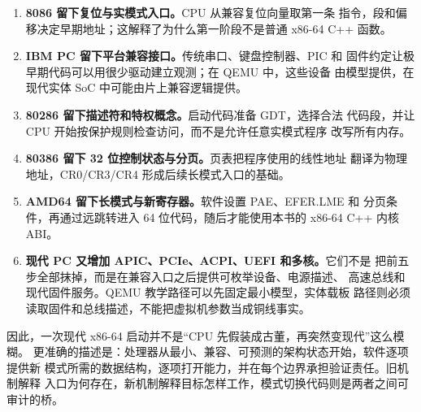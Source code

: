 \begin{enumerate}[leftmargin=2.4em]
  \item \textbf{8086 留下复位与实模式入口。}CPU 从兼容复位向量取第一条
        指令，段和偏移决定早期地址；这解释了为什么第一阶段不是普通
        x86-64 C++ 函数。
  \item \textbf{IBM PC 留下平台兼容接口。}传统串口、键盘控制器、PIC 和
        固件约定让极早期代码可以用很少驱动建立观测；在 QEMU 中，这些设备
        由模型提供，在现代实体 SoC 中可能由片上兼容逻辑提供。
  \item \textbf{80286 留下描述符和特权概念。}启动代码准备 GDT，选择合法
        代码段，并让 CPU 开始按保护规则检查访问，而不是允许任意实模式程序
        改写所有内存。
  \item \textbf{80386 留下 32 位控制状态与分页。}页表把程序使用的线性地址
        翻译为物理地址，CR0/CR3/CR4 形成后续长模式入口的基础。
  \item \textbf{AMD64 留下长模式与新寄存器。}软件设置 PAE、EFER.LME 和
        分页条件，再通过远跳转进入 64 位代码，随后才能使用本书的
        x86-64 C++ 内核 ABI。
  \item \textbf{现代 PC 又增加 APIC、PCIe、ACPI、UEFI 和多核。}它们不是
        把前五步全部抹掉，而是在兼容入口之后提供可枚举设备、电源描述、
        高速总线和现代固件服务。QEMU 教学路径可以先固定最小模型，实体载板
        路径则必须读取固件和总线描述，不能把虚拟机参数当成铜线事实。
\end{enumerate}

因此，一次现代 x86-64 启动并不是“CPU 先假装成古董，再突然变现代”这么模糊。
更准确的描述是：处理器从最小、兼容、可预测的架构状态开始，软件逐项提供新
模式所需的数据结构，逐项打开能力，并在每个边界承担验证责任。旧机制解释
入口为何存在，新机制解释目标怎样工作，模式切换代码则是两者之间可审计的桥。
